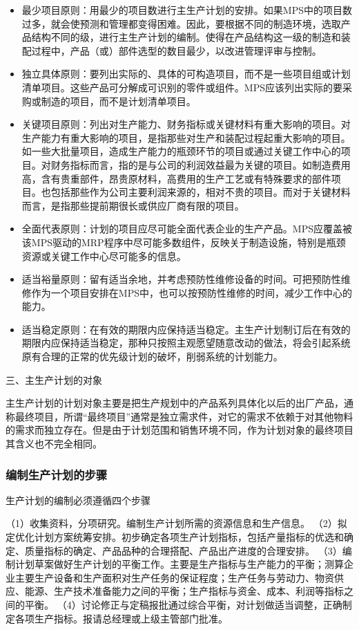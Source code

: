         \begin{itemize}
            \item  最少项目原则：用最少的项目数进行主生产计划的安排。如果MPS中的项目数过多，就会使预测和管理都变得困难。因此，要根据不同的制造环境，选取产品结构不同的级，进行主生产计划的编制。使得在产品结构这一级的制造和装配过程中，产品（或）部件选型的数目最少，以改进管理评审与控制。
            \item  独立具体原则：要列出实际的、具体的可构造项目，而不是一些项目组或计划清单项目。这些产品可分解成可识别的零件或组件。MPS应该列出实际的要采购或制造的项目，而不是计划清单项目。
            \item  关键项目原则：列出对生产能力、财务指标或关键材料有重大影响的项目。对生产能力有重大影响的项目，是指那些对生产和装配过程起重大影响的项目。如一些大批量项目，造成生产能力的瓶颈环节的项目或通过关键工作中心的项目。对财务指标而言，指的是与公司的利润效益最为关键的项目。如制造费用高，含有贵重部件，昂贵原材料，高费用的生产工艺或有特殊要求的部件项目。也包括那些作为公司主要利润来源的，相对不贵的项目。而对于关键材料而言，是指那些提前期很长或供应厂商有限的项目。
            \item  全面代表原则：计划的项目应尽可能全面代表企业的生产产品。MPS应覆盖被该MPS驱动的MRP程序中尽可能多数组件，反映关于制造设施，特别是瓶颈资源或关键工作中心尽可能多的信息。
            \item  适当裕量原则：留有适当余地，并考虑预防性维修设备的时间。可把预防性维修作为一个项目安排在MPS中，也可以按预防性维修的时间，减少工作中心的能力。
            \item  适当稳定原则：在有效的期限内应保持适当稳定。主生产计划制订后在有效的期限内应保持适当稳定，那种只按照主观愿望随意改动的做法，将会引起系统原有合理的正常的优先级计划的破坏，削弱系统的计划能力。
        \end{itemize}

    三、主生产计划的对象

    主生产计划的计划对象主要是把生产规划中的产品系列具体化以后的出厂产品，通称最终项目，所谓“最终项目”通常是独立需求件，对它的需求不依赖于对其他物料的需求而独立存在。但是由于计划范围和销售环境不同，作为计划对象的最终项目其含义也不完全相同。

    \subsubsection {编制生产计划的步骤}

    生产计划的编制必须遵循四个步骤

    （1）收集资料，分项研究。编制生产计划所需的资源信息和生产信息。
    （2）拟定优化计划方案统筹安排。初步确定各项生产计划指标，包括产量指标的优选和确定、质量指标的确定、产品品种的合理搭配、产品出产进度的合理安排。
    （3）编制计划草案做好生产计划的平衡工作。主要是生产指标与生产能力的平衡；测算企业主要生产设备和生产面积对生产任务的保证程度；生产任务与劳动力、物资供应、能源、生产技术准备能力之间的平衡；生产指标与资金、成本、利润等指标之间的平衡。
    （4）讨论修正与定稿报批通过综合平衡，对计划做适当调整，正确制定各项生产指标。报请总经理或上级主管部门批准。

